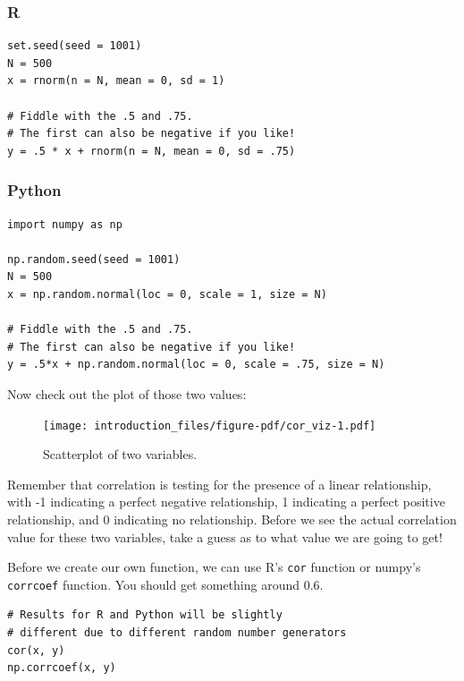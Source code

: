 \documentclass[
  letterpaper,
]{krantz}
\begin{document}
\subsubsection{R}

\begin{verbatim}
set.seed(seed = 1001)
N = 500
x = rnorm(n = N, mean = 0, sd = 1)

# Fiddle with the .5 and .75.
# The first can also be negative if you like!
y = .5 * x + rnorm(n = N, mean = 0, sd = .75)
\end{verbatim}

\subsubsection{Python}

\begin{verbatim}
import numpy as np

np.random.seed(seed = 1001)
N = 500
x = np.random.normal(loc = 0, scale = 1, size = N)

# Fiddle with the .5 and .75. 
# The first can also be negative if you like!
y = .5*x + np.random.normal(loc = 0, scale = .75, size = N) 
\end{verbatim}

Now check out the plot of those two values:

\begin{figure}

{\centering \texttt{[image: introduction\_files/figure-pdf/cor\_viz-1.pdf]}

}

\caption{Scatterplot of two variables.}

\end{figure}

Remember that correlation is testing for the presence of a linear
relationship, with -1 indicating a perfect negative relationship, 1
indicating a perfect positive relationship, and 0 indicating no
relationship. Before we see the actual correlation value for these two
variables, take a guess as to what value we are going to get!

Before we create our own function, we can use R's \texttt{cor} function
or numpy's \texttt{corrcoef} function. You should get something around
0.6.

\begin{verbatim}
# Results for R and Python will be slightly
# different due to different random number generators
cor(x, y)
np.corrcoef(x, y)
\end{verbatim}
\end{document}
